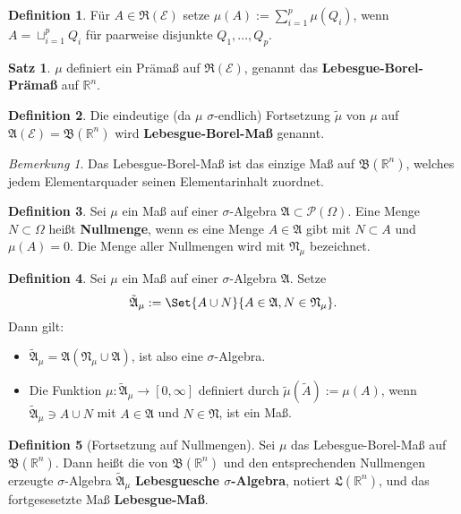 \documentclass[a4paper,10pt,landscape]{article}
\newcommand{\R}{\mathbb{R}}
\newcommand{\PS}{\mathcal{P}} %
\newcommand{\PSO}{\PS(\Omega)} %
\newcommand{\Alg}{\mathfrak{A}}
\newcommand{\Ring}{\mathfrak{R}}
\newcommand{\Bor}{\mathfrak{B}} %
\theoremstyle{definition}
\newtheorem*{defn}{Definition}
\newtheorem*{satz}{Satz}
\theoremstyle{remark}
\newtheorem*{bem}{Bemerkung}
\renewcommand{\emph}[1]{\textcolor{Emph}{\bf{#1}}}
\begin{document}
\begin{multicols}{3}
\begin{defn}
  Für $A \in \Ring(\mathcal{E})$ setze $\mu(A) := \textstyle\sum_{i = 1}^p \mu(Q_i)$, wenn $A = \sqcup_{i = 1}^p Q_i$ für paarweise disjunkte $Q_1, ..., Q_p$.
\end{defn}

\begin{satz}
  $\mu$ definiert ein Prämaß auf $\Ring(\mathcal{E})$, genannt das \emph{Lebesgue-Borel-Prämaß} auf $\R^n$.
\end{satz}

\begin{defn}
  Die eindeutige (da $\mu$ $\sigma$-endlich) Fortsetzung $\tilde{\mu}$ von $\mu$ auf $\Alg(\mathcal{E}) = \Bor(\R^n)$ wird \emph{Lebesgue-Borel-Maß} genannt.
\end{defn}

\begin{bem}
  Das Lebesgue-Borel-Maß ist das einzige Maß auf $\Bor(\R^n)$, welches jedem Elementarquader seinen Elementarinhalt zuordnet.
\end{bem}

\begin{defn}
  Sei $\mu$ ein Maß auf einer $\sigma$-Algebra $\Alg \subset \PSO$. Eine Menge $N \subset \Omega$ heißt \emph{Nullmenge}, wenn es eine Menge $A \in \Alg$ gibt mit $N \subset A$ und $\mu(A) = 0$. Die Menge aller Nullmengen wird mit $\mathfrak{N}_\mu$ bezeichnet.
\end{defn}

\begin{defn}
  Sei $\mu$ ein Maß auf einer $\sigma$-Algebra $\Alg$. Setze
  \[ \tilde{\Alg}_\mu := \Set{ A \cup N }{ A \in \Alg, N \in \mathfrak{N}_\mu }. \]
  Dann gilt:
  \begin{itemize}
    \item $\tilde{\Alg}_\mu = \Alg(\mathfrak{N}_\mu \cup \Alg)$, ist also eine $\sigma$-Algebra.
    \item Die Funktion $\mu : \tilde{\Alg}_\mu \to [0, \infty]$ definiert durch $\tilde\mu(\tilde{A}) := \mu(A)$, wenn $\tilde{\Alg}_\mu \ni A \cup N$ mit $A \in \Alg$ und $N \in \mathfrak{N}$, ist ein Maß.
  \end{itemize}
\end{defn}

\begin{defn}[Fortsetzung auf Nullmengen]
  Sei $\mu$ das Lebesgue-Borel-Maß auf $\Bor(\R^n)$. Dann heißt die von $\Bor(\R^n)$ und den entsprechenden Nullmengen erzeugte $\sigma$-Algebra $\tilde{\Alg}_\mu$ \emph{Lebesguesche $\sigma$-Algebra}, notiert $\mathfrak{L}(\R^n)$, und das fortgesesetzte Maß \emph{Lebesgue-Maß}.
\end{defn}


\end{multicols}
\end{document}
